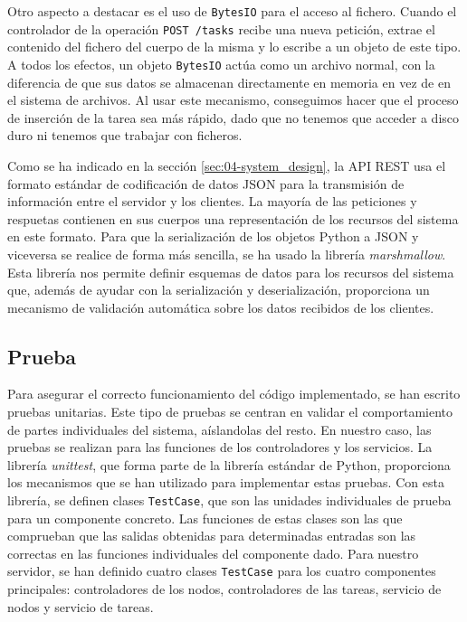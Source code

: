 Otro aspecto a destacar es el uso de \texttt{BytesIO} para el acceso al fichero.
Cuando el controlador de la operación \texttt{POST /tasks} recibe una nueva
petición, extrae el contenido del fichero del cuerpo de la misma y lo escribe a
un objeto de este tipo. A todos los efectos, un objeto \texttt{BytesIO} actúa
como un archivo normal, con la diferencia de que sus datos se almacenan
directamente en memoria en vez de en el sistema de archivos. Al usar este
mecanismo, conseguimos hacer que el proceso de inserción de la tarea sea más
rápido, dado que no tenemos que acceder a disco duro ni tenemos que trabajar con
ficheros.

Como se ha indicado en la sección \ref{sec:04-system_design}, la API REST usa el
formato estándar de codificación de datos JSON para la transmisión de
información entre el servidor y los clientes. La mayoría de las peticiones y
respuetas contienen en sus cuerpos una representación de los recursos del
sistema en este formato. Para que la serialización de los objetos Python a JSON
y viceversa se realice de forma más sencilla, se ha usado la librería
\textit{marshmallow}. Esta librería nos permite definir esquemas de datos para
los recursos del sistema que, además de ayudar con la serialización y
deserialización, proporciona un mecanismo de validación automática sobre los
datos recibidos de los clientes.

\subsection{Prueba}

Para asegurar el correcto funcionamiento del código implementado, se han escrito
pruebas unitarias. Este tipo de pruebas se centran en validar el comportamiento
de partes individuales del sistema, aíslandolas del resto. En nuestro caso, las
pruebas se realizan para las funciones de los controladores y los servicios. La
librería \textit{unittest}, que forma parte de la librería estándar de Python,
proporciona los mecanismos que se han utilizado para implementar estas pruebas.
Con esta librería, se definen clases \texttt{TestCase}, que son las unidades
individuales de prueba para un componente concreto. Las funciones de estas
clases son las que comprueban que las salidas obtenidas para determinadas
entradas son las correctas en las funciones individuales del componente dado.
Para nuestro servidor, se han definido cuatro clases \texttt{TestCase} para los
cuatro componentes principales: controladores de los nodos, controladores de las
tareas, servicio de nodos y servicio de tareas.

